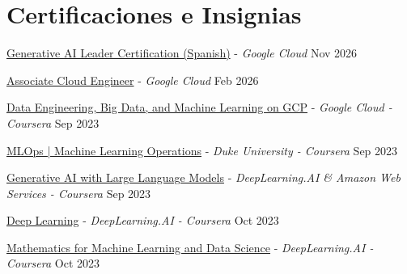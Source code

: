 \documentclass[letter,10pt]{article}
\begin{document}
\section{Certif{}icaciones e Insignias}
\begin{zitemize}
    \item \href{https://www.credly.com/badges/6cf3e9ab-4273-437c-b1a1-de7fd75c58f8}{Generative AI Leader Certification (Spanish)} - \textit{Google Cloud} \hfill Nov 2026
    \item \href{https://www.credly.com/badges/adc543d1-0d0a-42cf-9b76-f09412427cd1}{Associate Cloud Engineer} - \textit{Google Cloud} \hfill Feb 2026
    \item \href{https://www.coursera.org/account/accomplishments/specialization/94N7VQDPURXZ}{Data Engineering, Big Data, and Machine Learning on GCP} - \textit{Google Cloud - Coursera} \hfill Sep 2023
    \item \href{https://www.coursera.org/account/accomplishments/specialization/TQAEV5VXPVRC}{MLOps | Machine Learning Operations} - \textit{Duke University - Coursera} \hfill Sep 2023
    \item \href{https://www.coursera.org/account/accomplishments/verify/9RVETDFCQ98N}{Generative AI with Large Language Models} - \textit{DeepLearning.AI \& Amazon Web Services - Coursera} \hfill Sep 2023
    \item \href{https://www.coursera.org/account/accomplishments/specialization/4NN6BWAJ6Y9C}{Deep Learning} - \textit{DeepLearning.AI - Coursera} \hfill Oct 2023
    \item \href{https://www.coursera.org/account/accomplishments/specialization/YV2XYVC2GGS3}{Mathematics for Machine Learning and Data Science} - \textit{DeepLearning.AI - Coursera} \hfill Oct 2023
\end{zitemize}
\end{document}
